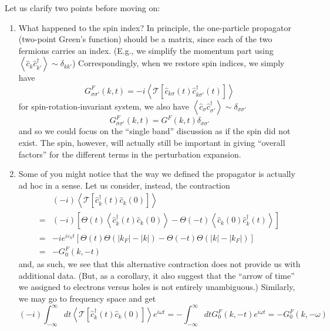 Let us clarify two points before moving on:
\begin{enumerate}
    \item What happened to the spin index? In principle, the one-particle propagator (two-point Green's function) should be a matrix, since each of the two fermions carries an index. (E.g., we simplify the momentum part using $\left< \hat{c}_k\hat{c}_{k'}^{\dagger} \right> \sim \delta _{kk'}$) Correspondingly, when we restore spin indices, we simply have
    \[ G_{\sigma \sigma '}^{F}(k,t)=-i\left< \mathcal{T} \left[ \hat{c}_{k\sigma}\left( t \right) \hat{c}_{k\sigma '}^{\dagger}\left( t \right) \right] \right> \]
    for spin-rotation-invariant system, we also have $\left< \hat{c}_{\sigma}\hat{c}_{\sigma '}^{\dagger} \right> \sim \delta _{\sigma \sigma '}$
    \[ G_{\sigma \sigma '}^{F}\left( k,t \right) =G^F\left( k,t \right) \delta _{\sigma \sigma '}\]
    and so we could focus on the ``single band'' discussion as if the spin did not exist. The spin, however, will actually still be important in giving ``overall factors'' for the different terms in the perturbation expansion.
    \item Some of you might notice that the way we defined the propagator is actually ad hoc in a sense. Let us consider, instead, the contraction
    \begin{align*}
        &\left( -i \right) \left< \mathcal{T} \left[ \hat{c}_{k}^{\dagger}\left( t \right) \hat{c}_k\left( 0 \right) \right] \right> \\
        =&\left( -i \right) \left[ \Theta \left( t \right) \left< \hat{c}_{k}^{\dagger}\left( t \right) \hat{c}_k\left( 0 \right) \right> -\Theta \left( -t \right) \left< \hat{c}_k\left( 0 \right) \hat{c}_{k}^{\dagger}\left( t \right) \right> \right] \\
        =&-ie^{i\varepsilon _kt}\left[ \Theta \left( t \right) \Theta \left( \left| k_F \right|-\left| k \right| \right) -\Theta \left( -t \right) \Theta \left( \left| k \right|-\left| k_F \right| \right) \right] \\
        =&-G_{0}^{F}\left( k,-t \right)
    \end{align*}
    and, as such, we see that this alternative contraction does not provide us with additional data. (But, as a corollary, it also suggest that the ``arrow of time'' we assigned to electrons versus holes is not entirely unambiguous.) Similarly, we may go to frequency space and get
    \[ \left( -i \right) \int_{-\infty}^{\infty}{dt\left< \mathcal{T} \left[ \hat{c}_{k}^{\dagger}\left( t \right) \hat{c}_k\left( 0 \right) \right] \right> e^{i\omega t}}=-\int_{-\infty}^{\infty}{dtG_{0}^{F}\left( k,-t \right) e^{i\omega t}}=-G_{0}^{F}\left( k,-\omega \right) \]
\end{enumerate}

